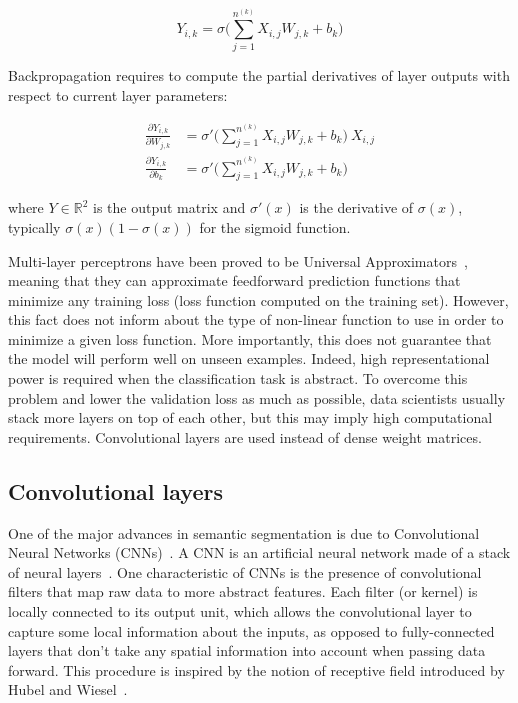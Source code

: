         \begin{equation}
            Y_{i, k} = \sigma \Big( \sum\limits_{j=1}^{n^{(k)}} X_{i, j} W_{j, k} + b_{k} \Big)
        \end{equation}

        Backpropagation requires to compute the partial derivatives of layer outputs with respect to current layer parameters:

        \begin{align}
            \frac{\partial Y_{i, k}}{\partial W_{j, k}} & = \sigma' \Big( \sum\limits_{j=1}^{n^{(k)}} X_{i, j} W_{j, k} + b_{k} \Big) \ X_{i, j} \\
            \frac{\partial Y_{i, k}}{\partial b_{k}} & = \sigma' \Big( \sum\limits_{j=1}^{n^{(k)}} X_{i, j} W_{j, k} + b_{k} \Big)
        \end{align}

        where $Y \in \mathbb{R}^2$ is the output matrix and $\sigma'(x)$ is the derivative of $\sigma(x)$,
        typically $\sigma(x) (1 - \sigma(x))$ for the sigmoid function.

        Multi-layer perceptrons have been proved to be Universal Approximators~\cite{hornik1991approximation},
        meaning that they can approximate feedforward prediction functions that minimize any training loss (loss function computed on the training set).
        However, this fact does not inform about the type of non-linear function to use in order to minimize
        a given loss function. More importantly, this does not guarantee that the model will perform well on unseen examples.
        Indeed, high representational power is required when the classification task is abstract.
        To overcome this problem and lower the validation loss as much as possible, data scientists usually stack more layers on top of each other,
        but this may imply high computational requirements. Convolutional layers are used instead of dense weight matrices.

    \subsection{Convolutional layers}

        One of the major advances in semantic segmentation
        is due to Convolutional Neural Networks (CNNs)~\cite{DBLP:journals/corr/Garcia-GarciaOO17}.
        A CNN is an artificial neural network made of a stack of neural layers~\cite{lecun1998gradient}. One characteristic of CNNs is the
        presence of convolutional filters that map raw data to more abstract features. Each filter (or kernel) is locally connected to its output unit, which
        allows the convolutional layer to capture some local information about the inputs, as opposed to fully-connected layers that don't take any spatial
        information into account when passing data forward. This procedure is inspired by the notion of receptive field introduced 
        by Hubel and Wiesel~\cite{Hubel1962}.

